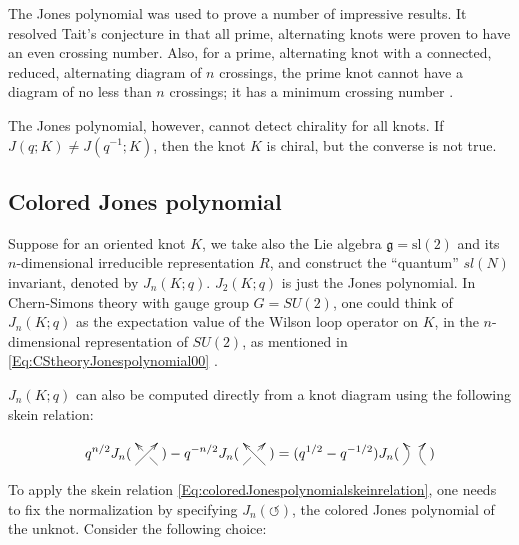\documentclass[a4paper,titlepage,twoside]{book}
\begin{document}
The Jones polynomial was used to prove a number of impressive results.  It resolved Tait's conjecture in that all prime, alternating knots were proven to have an even crossing number.  Also, for a prime, alternating knot with a connected, reduced, alternating diagram of $n$ crossings, the prime knot cannot have a diagram of no less than $n$ crossings; it has a minimum crossing number \cite{Lickorish1997}.  

The Jones polynomial, however, cannot detect chirality for all knots.  If $J(q;K) \neq J(q^{-1};K)$, then the knot $K$ is chiral, but the converse is not true.  

\subsection{Colored Jones polynomial}

Suppose for an oriented knot $K$, we take also the Lie algebra $\mathfrak{g} = \text{sl}{(2)}$ and its  $n$-dimensional irreducible representation $R$, and construct the ``quantum'' $sl{(N)}$ invariant, denoted by $J_n(K;q)$.  %
$J_2{(K;q)}$ is just the Jones polynomial.  In Chern-Simons theory with gauge group $G=SU(2)$, one could think of $J_n{ (K;q)}$ as the expectation value of the Wilson loop operator on $K$, in the $n$-dimensional representation of $SU(2)$, as mentioned in \eqref{Eq:CStheoryJonespolynomial00} \cite{GukovSaberi2012}.

$J_n(K;q)$ can also be computed directly from a knot diagram using the following skein relation:
\begin{equation}
q^{n/2} J_n( \xygraph{
  !{0;/r1.3pc/:}
  [u(0.5)]!{\xoverv[-1]=>}
})  -q^{-n/2 }J_n(  \xygraph{
  !{0;/r1.3pc/:}
  [u(0.5)]!{\xunderv[-1]=>}
  } ) = (q^{1/2}- q^{-1/2} ) J_n( \xygraph{
  !{0;/r1.3pc/:}
  [u(0.5)]!{\xunoverv[-1]=>}
} )  \label{Eq:coloredJonespolynomialskeinrelation}
\end{equation}


To apply the skein relation \eqref{Eq:coloredJonespolynomialskeinrelation}, one needs to fix the normalization by specifying $J_n{(\circlearrowleft)}$, the colored Jones polynomial of the unknot.  Consider the following choice:
\end{document}
